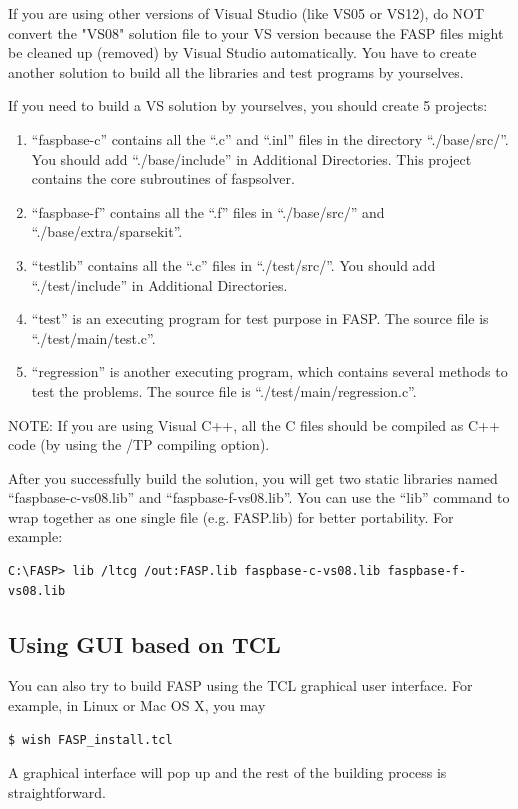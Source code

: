 \documentclass[11pt]{memoir}
\begin{document}
\begin{snugshade}\noindent
If you are using other versions of Visual Studio (like VS05 or VS12), do NOT convert the "VS08" solution file to your VS version because the FASP files might be cleaned up (removed) by Visual Studio automatically. You have to create another solution to build all the libraries and test programs by yourselves.
\end{snugshade}

If you need to build a VS solution by yourselves, you should create 5 projects:
\begin{enumerate}
\item ``faspbase-c'' contains all the ``.c'' and ``.inl'' files in the directory ``./base/src/''. You should add ``./base/include'' in Additional Directories. This project contains the core subroutines of faspsolver. 
\item ``faspbase-f'' contains all the ``.f'' files in ``./base/src/'' and ``./base/extra/sparsekit''. 
\item ``testlib'' contains all the ``.c'' files in ``./test/src/''. You should add ``./test/include'' in Additional Directories.
\item ``test'' is an executing program for test purpose in FASP. The source file is ``./test/main/test.c''.
\item ``regression'' is another executing program, which contains several methods to test the problems. The source file is ``./test/main/regression.c''.
\end{enumerate}

\begin{snugshade}\noindent
NOTE: If you are using Visual C++, all the C files should be compiled as C++ code (by using the /TP compiling option).
\end{snugshade}

After you successfully build the solution, you will get two static libraries named ``faspbase-c-vs08.lib'' and ``faspbase-f-vs08.lib''. You can use the ``lib'' command to wrap together as one single file (e.g. FASP.lib) for better portability. For example:
%
\begin{lstlisting}[numbers=none]
C:\FASP> lib /ltcg /out:FASP.lib faspbase-c-vs08.lib faspbase-f-vs08.lib
\end{lstlisting}
%

\subsection{Using GUI based on TCL}
You can also try to build FASP using the TCL graphical user interface. For example, in Linux or Mac OS X, you may 
%
\begin{lstlisting}[numbers=none]
$ wish FASP_install.tcl
\end{lstlisting}
%
A graphical interface will pop up and the rest of the building process is straightforward. 
\end{document}
